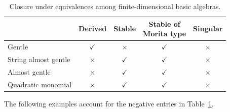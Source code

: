 \documentclass[11pt]{article}
\theoremstyle{definition}
\begin{document}
	\begin{table}[!htbp]
		\centering
		\small
		\renewcommand{\arraystretch}{1.25}
		\begin{tabular}{@{}lcccc@{}}
			\toprule
			& Derived & Stable & \shortstack{Stable of\\Morita type} & Singular \\
			\midrule
			Gentle & $\checkmark$ & $\times$ & $\checkmark$ & $\times$ \\
			String almost gentle & $\times$ & $\checkmark$ & $\checkmark$ & $\times$ \\
			Almost gentle & $\times$ & $\checkmark$ & $\checkmark$ & $\times$ \\
			Quadratic monomial & $\times$ & $\checkmark$ & $\checkmark$ & $\times$ \\
			\bottomrule
		\end{tabular}
		\caption{Closure under equivalences among finite-dimensional basic algebras.}
		\label{table of closure properties}
	\end{table}

	The following examples account for the negative entries in Table~\ref{table of closure properties}.
\end{document}
